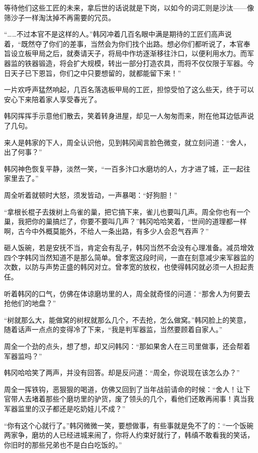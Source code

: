 等待他们这些工匠的未来，拿后世的话说就是下岗，以如今的词汇则是沙汰——像筛沙子一样淘汰掉不再需要的冗员。

“……不过本官不是这样的人。”韩冈冲着几百名眼中满是期待的工匠们高声说着，“既然夺了你们的差事，当然会为你们找个出路。想必你们都听说了，本官奉旨设立板甲局之后，就奏请天子，将局中作坊逐渐移往汴口，以便利用水力。而军器监的铁器锻造，将会扩大规模，转出一部分打造农具，而将不仅仅限于军器。今日天子已下恩旨，你们之中只要想留的，就都能留下来！”

一片欢呼声猛然响起，几百名落选板甲局的工匠，担惊受怕了这么些天，终于可以安心下来陪着家人享受春光了。

韩冈挥挥手示意他们散去，笑着转身进屋，却见一人匆匆而来，附在他耳边低声说了几句。

来人是韩家的下人，周全认识他，见到韩冈闻言脸色微变，就立刻问道：“舍人，出了何事？”

韩冈神色恢复平静，淡然一笑，“一百多汴口水磨坊的人，方才进了城，正一起往家里去了。”

周全听着就顿时大怒，须发皆动，一声暴喝：“好狗胆！”

“拿根长棍子去拨树上鸟雀的巢，把它搞下来，雀儿也要叫几声。周全你也有一个巢，我把你的巢搞烂了，你要不要叫几声？”韩冈哈哈笑着，“世间的道理都一样啊，古今中外概莫能外，不给人一条出路，有多少人会忍气吞声？”

砸人饭碗，若是安抚不当，肯定会有乱子，韩冈当然不会没有心理准备。减员增效四个字韩冈当然知道不是那么简单。曾孝宽这段时间，一直在刻意减少来军器监的次数，以防与声势正盛的韩冈对立。曾孝宽的放权，也使得韩冈就必须一人担起责任。

听着韩冈的口气，仿佛在体谅磨坊里的人，周全就奇怪的问道：“那舍人为何要去抢他们的地盘？”

“树就那么大，能做窝的树杈就那么几个，不去抢，怎么做窝。”韩冈脸上的笑意，随着话声一点点的变得冷了下来，“我是判军器监，当然要顾着自家人。”

周全一个劲的点头，想了想，却又问韩冈：“那如果舍人在三司里做事，还会帮着军器监吗？”

韩冈哈哈笑了两声，并没有回答。却是反问道：“周全，你说现在该怎么办？”

周全一挥铁钩，恶狠狠的喝道，仿佛又回到了当年战前请命的时候：“舍人！让下官带人去堵着那些个磨坊里的驴货，废了领头的几个，看他们还敢再闹事！真当我军器监里的汉子都还是吃奶娃儿不成？”

“你有这个心就行了。”韩冈微微一笑，要想做事，有些事就是免不了的：“一个饭碗两家争，磨坊的人已经进城来闹了，你将人约束好就行了，韩缜不敢看我的笑话，你旧时的那些兄弟也不是白白吃饭的。”

